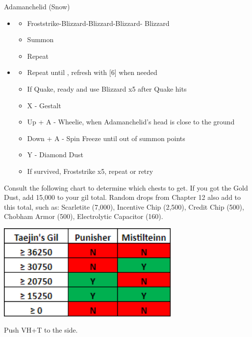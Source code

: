 \begin{battle}[0:54]{Adamanchelid (Snow)}
	\begin{itemize}
		\item \sixth
		      \begin{itemize}
			      \item Froststrike-Blizzard-Blizzard-Blizzard- Blizzard
			      \item Summon
			      \item Repeat
		      \end{itemize}
		\item \fifth
		      \begin{itemize}
			      \item Repeat until \stagger, refresh with [6] when needed
			      \item If Quake, ready and use Blizzard x5 after Quake hits
			      \item X - Gestalt
			      \item Up + A - Wheelie, when Adamanchelid's head is close to the ground
			      \item Down + A - Spin Freeze until out of summon points
			      \item Y - Diamond Dust
			      \item If survived, Froststrike x5, repeat or retry
		      \end{itemize}
	\end{itemize}
\end{battle}

Consult the following chart to determine which chests to get. If you got the Gold Dust, add 15,000 to your gil total. Random drops from Chapter 12 also add to this total, such as: Scarletite (7,000), Incentive Chip (2,500), Credit Chip (500), Chobham Armor (500), Electrolytic Capacitor (160).

\begingroup
\includegraphics[width=9cm]{./Chapters/gil_pickups.png}
\endgroup

Push VH+T to the side.
\vfill
\ 
\columnbreak

